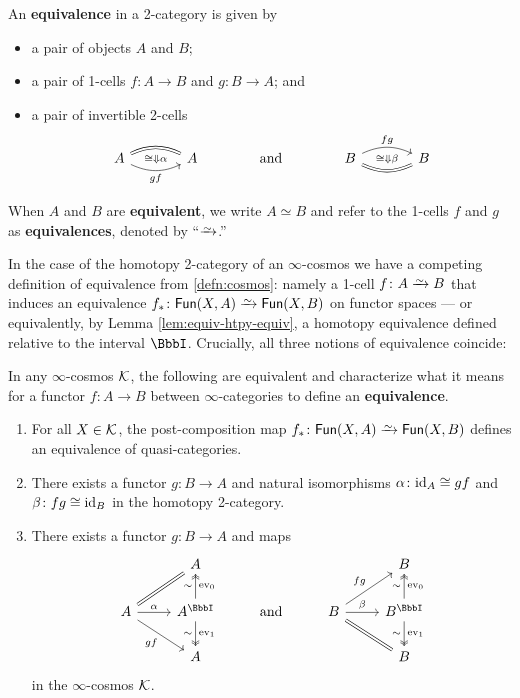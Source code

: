   \begin{defn}[equivalence]\label{defn:2-cat-equiv} An \textbf{equivalence} in a 2-category is given by
  \begin{itemize}
  \item a pair of objects $A$ and $B$;
  \item a pair of 1-cells $f \colon A \to B$ and $g \colon B \to A$; and
  \item a pair of invertible 2-cells
  \[
  \begin{tikzcd}[column sep=large]
  A \arrow[r, bend left=25, equals] \arrow[r, bend right=25, "gf"'] \arrow[r, phantom, "{\scriptstyle\cong\Downarrow\alpha}"] & A & \text{and} & B \arrow[r, bend right=25, equals] \arrow[r, bend left=25, "fg"] \arrow[r, phantom, "{\scriptstyle\cong\Downarrow\beta}"] & B
  \end{tikzcd}
  \]
  \end{itemize}
  When $A$ and $B$ are \textbf{equivalent}, we write $A \simeq B$ and refer to the 1-cells $f$ and $g$ as \textbf{equivalences}, denoted by ``$\we$.''
  \end{defn}

  In the case of the homotopy 2-category of an $\infty$-cosmos we have a competing definition of equivalence from \ref{defn:cosmos}: namely a 1-cell $f \colon A \we B$ that induces an equivalence $f_* \colon \Fun(X,A) \we \Fun(X,B)$ on functor spaces --- or equivalently, by Lemma \ref{lem:equiv-htpy-equiv}, a homotopy equivalence defined relative to the interval $\iso$. Crucially, all three notions of equivalence coincide:

  \begin{thm}\label{thm:equiv-are-equiv} In any $\infty$-cosmos ${\mathord{\mathcal{K}}}$, the following are equivalent and characterize what it means for a functor $f \colon A \to B$ between $\infty$-categories to define an \textbf{equivalence}.
  \begin{enumerate}
  \item\label{itm:rep-equiv} For all $X \in {\mathord{\mathcal{K}}}$, the post-composition map $f_* \colon \Fun(X,A) \we \Fun(X,B)$ defines an equivalence of quasi-categories.
  \item\label{itm:2cat-equiv} There exists a functor $g \colon B \to A$ and natural isomorphisms $\alpha \colon \textup{id}_A \cong gf$ and $\beta \colon fg \cong \textup{id}_B$ in the homotopy 2-category.
  \item\label{itm:htpy-equiv} There exists a functor $g \colon B \to A$ and maps
  \[
  \begin{tikzcd} & A & &  & B \\ A \arrow[ur, equals] \arrow[dr, "gf"'] \arrow[r, "\alpha"] & A^\iso  \arrow[u, two heads, "\sim", "\ev_0"'] \arrow[d, two heads, "\sim"', "\ev_1"] &\text{and} &  B \arrow[dr, equals] \arrow[r, "\beta"] \arrow[ur, "fg"] & B^\iso \arrow[u, two heads, "\sim", "\ev_0"'] \arrow[d, two heads, "\sim"', "\ev_1"] \\ & A & &  & B
  \end{tikzcd}
  \] in the $\infty$-cosmos ${\mathord{\mathcal{K}}}$.
  \end{enumerate}
  \end{thm}

